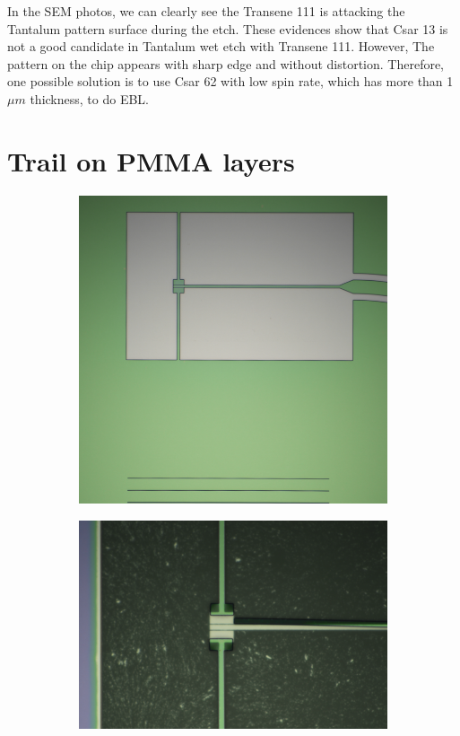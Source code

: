 In the SEM photos, we can clearly see the Transene 111 is attacking the Tantalum pattern surface during the etch. These evidences show that Csar 13 is not a good candidate in Tantalum wet etch with Transene 111. However, The pattern on the chip appears with sharp edge and without distortion. Therefore, one possible solution is to use Csar 62 with low spin rate, which has more than 1 $\mu m$ thickness, to do EBL.

\section{Trail on PMMA layers}

\begin{figure}[h!]
    \centering
    \begin{subfigure}[b]{0.6\textwidth}
         \centering
         \includegraphics[width=1\textwidth]{Pic/PMMA_postdev.png}
         \caption{}
         \label{}
     \end{subfigure}
     \hfill
    \begin{subfigure}[b]{0.6\textwidth}
         \centering
         \includegraphics[width=1\textwidth]{Pic/PMMA_postetch_0.png}

\end{subfigure}
\end{figure}
